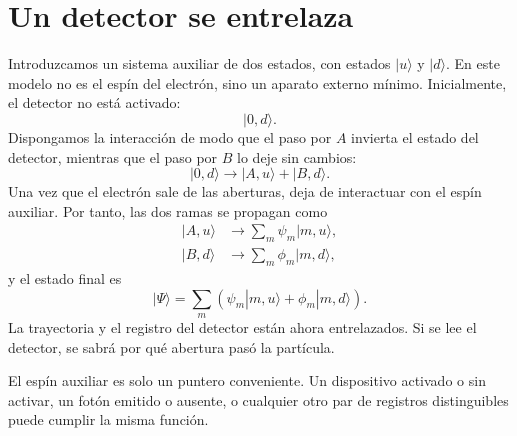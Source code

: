 \section{Un detector se entrelaza}

Introduzcamos un sistema auxiliar de dos estados, con estados \(|u\rangle\) y \(|d\rangle\). En este modelo no es el espín del electrón, sino un aparato externo mínimo. Inicialmente, el detector no está activado:
\begin{equation}
|0,d\rangle.
\end{equation}
Dispongamos la interacción de modo que el paso por \(A\) invierta el estado del detector, mientras que el paso por \(B\) lo deje sin cambios:
\begin{equation}
|0,d\rangle
\longrightarrow
|A,u\rangle+|B,d\rangle.
\end{equation}
Una vez que el electrón sale de las aberturas, deja de interactuar con el espín auxiliar. Por tanto, las dos ramas se propagan como
\begin{align}
|A,u\rangle &\longrightarrow \sum_m\psi_m|m,u\rangle, \\
|B,d\rangle &\longrightarrow \sum_m\phi_m|m,d\rangle,
\end{align}
y el estado final es
\begin{equation}
|\Psi\rangle
=\sum_m\left(\psi_m|m,u\rangle+\phi_m|m,d\rangle\right).
\end{equation}
La trayectoria y el registro del detector están ahora entrelazados. Si se lee el detector, se sabrá por qué abertura pasó la partícula.

\begin{classroomqa}
\end{classroomqa}

El espín auxiliar es solo un puntero conveniente. Un dispositivo activado o sin activar, un fotón emitido o ausente, o cualquier otro par de registros distinguibles puede cumplir la misma función.


